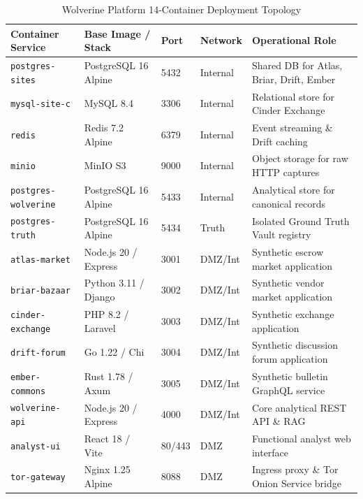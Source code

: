 \begin{table}[htbp]
\centering
\small
\caption{Wolverine Platform 14-Container Deployment Topology}
\label{tab:container-topology}
\begin{tabular}{@{}llllp{4.2cm}@{}}
\toprule
\textbf{Container Service} & \textbf{Base Image / Stack} & \textbf{Port} & \textbf{Network} & \textbf{Operational Role} \\ \midrule
\texttt{postgres-sites} & PostgreSQL 16 Alpine & 5432 & Internal & Shared DB for Atlas, Briar, Drift, Ember \\
\texttt{mysql-site-c} & MySQL 8.4 & 3306 & Internal & Relational store for Cinder Exchange \\
\texttt{redis} & Redis 7.2 Alpine & 6379 & Internal & Event streaming \& Drift caching \\
\texttt{minio} & MinIO S3 & 9000 & Internal & Object storage for raw HTTP captures \\
\texttt{postgres-wolverine} & PostgreSQL 16 Alpine & 5433 & Internal & Analytical store for canonical records \\
\texttt{postgres-truth} & PostgreSQL 16 Alpine & 5434 & Truth & Isolated Ground Truth Vault registry \\ \addlinespace
\texttt{atlas-market} & Node.js 20 / Express & 3001 & DMZ/Int & Synthetic escrow market application \\
\texttt{briar-bazaar} & Python 3.11 / Django & 3002 & DMZ/Int & Synthetic vendor market application \\
\texttt{cinder-exchange} & PHP 8.2 / Laravel & 3003 & DMZ/Int & Synthetic exchange application \\
\texttt{drift-forum} & Go 1.22 / Chi & 3004 & DMZ/Int & Synthetic discussion forum application \\
\texttt{ember-commons} & Rust 1.78 / Axum & 3005 & DMZ/Int & Synthetic bulletin GraphQL service \\ \addlinespace
\texttt{wolverine-api} & Node.js 20 / Express & 4000 & DMZ/Int & Core analytical REST API \& RAG \\
\texttt{analyst-ui} & React 18 / Vite & 80/443 & DMZ & Functional analyst web interface \\
\texttt{tor-gateway} & Nginx 1.25 Alpine & 8088 & DMZ & Ingress proxy \& Tor Onion Service bridge \\ \bottomrule
\end{tabular}
\end{table}


